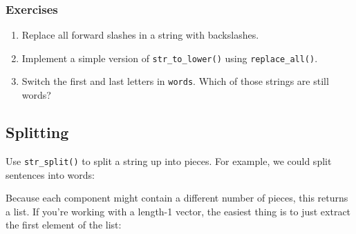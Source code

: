 \documentclass[]{book}
\newenvironment{Shaded}{\begin{snugshade}}{\end{snugshade}}
\newcommand{\KeywordTok}[1]{\textcolor[rgb]{0.13,0.29,0.53}{\textbf{{#1}}}}
\newcommand{\DecValTok}[1]{\textcolor[rgb]{0.00,0.00,0.81}{{#1}}}
\newcommand{\StringTok}[1]{\textcolor[rgb]{0.31,0.60,0.02}{{#1}}}
\newcommand{\CommentTok}[1]{\textcolor[rgb]{0.56,0.35,0.01}{\textit{{#1}}}}
\newcommand{\NormalTok}[1]{{#1}}
\begin{document}
\subsubsection{Exercises}\label{exercises-39}

\begin{enumerate}
\def\labelenumi{\arabic{enumi}.}
\item
  Replace all forward slashes in a string with backslashes.
\item
  Implement a simple version of \texttt{str\_to\_lower()} using
  \texttt{replace\_all()}.
\item
  Switch the first and last letters in \texttt{words}. Which of those
  strings are still words?
\end{enumerate}

\subsection{Splitting}\label{splitting}

Use \texttt{str\_split()} to split a string up into pieces. For example,
we could split sentences into words:

\begin{Shaded}
\end{Shaded}

Because each component might contain a different number of pieces, this
returns a list. If you're working with a length-1 vector, the easiest
thing is to just extract the first element of the list:
\end{document}
